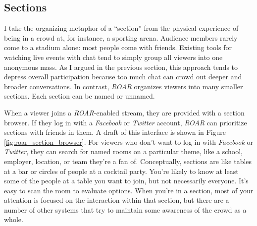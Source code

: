 \subsection{Sections}

I take the organizing metaphor of a ``section'' from the physical experience of being in a crowd at, for instance, a sporting arena. Audience members rarely come to a stadium alone: most people come with friends. Existing tools for watching live events with chat tend to simply group all viewers into one anonymous mass. As I argued in the previous section, this approach tends to depress overall participation because too much chat can crowd out deeper and broader conversations. In contrast, \emph{ROAR} organizes viewers into many  smaller sections. Each section can be named or unnamed. 

When a viewer joins a \emph{ROAR}-enabled stream, they are provided with a section browser. If they log in with a \emph{Facebook} or \emph{Twitter} account, \emph{ROAR} can prioritize sections with friends in them. A draft of this interface is shown in Figure \ref{fig:roar_section_browser}. For viewers who don't want to log in with \emph{Facebook} or \emph{Twitter}, they can search for named rooms on a particular theme, like a school, employer, location, or team they're a fan of. Conceptually, sections are like tables at a bar or circles of people at a cocktail party. You're likely to know at least some of the people at a table you want to join, but not necessarily everyone. It's easy to scan the room to evaluate options. When you're in a section, most of your attention is focused on the interaction within that section, but there are a number of other systems that try to maintain some awareness of the crowd as a whole. 

